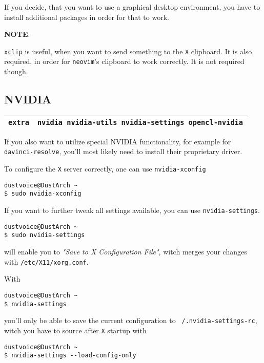 \documentclass[9pt]{report}
\newcommand{\admonition}[2]{\textbf{#1}: {#2}}
\begin{document}
If you decide, that you want to use a graphical desktop environment, you have to install additional packages in order for that to work.


\admonition{NOTE}{\texttt{xclip} is useful, when you want to send something to the \texttt{X} clipboard.
It is also required, in order for \texttt{neovim}'s clipboard to work correctly.
It is not required though.

}

\vfill\eject

\hypertarget{x-nvidia}{\subsection{NVIDIA}}
\begin{center}
\begin{tabular}{|c|c|}
\hline
\texttt{extra} & \texttt{nvidia nvidia-utils nvidia-settings opencl-nvidia} \\ 
\hline
\end{tabular}
\end{center}

If you also want to utilize special NVIDIA functionality, for example for \texttt{davinci-resolve}, you’ll most likely need to install their proprietary driver.


To configure the \texttt{X} server correctly, one can use \texttt{nvidia-xconfig}


\begin{verbatim}
dustvoice@DustArch ~
$ sudo nvidia-xconfig
\end{verbatim}

If you want to further tweak all settings available, you can use \texttt{nvidia-settings}.


\begin{verbatim}
dustvoice@DustArch ~
$ sudo nvidia-settings
\end{verbatim}

will enable you to \emph{"Save to X Configuration File"}, witch merges your changes with \texttt{/etc/X11/xorg.conf}.


With


\begin{verbatim}
dustvoice@DustArch ~
$ nvidia-settings
\end{verbatim}

you’ll only be able to save the current configuration to \texttt{~/.nvidia-settings-rc}, witch you have to source after \texttt{X} startup with


\begin{verbatim}
dustvoice@DustArch ~
$ nvidia-settings --load-config-only
\end{verbatim}
\end{document}
